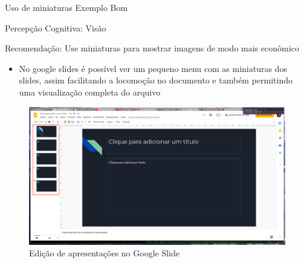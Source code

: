 \documentclass{beamer}
\begin{document}
\begin{frame}{Uso de miniaturas Exemplo Bom}

Percepção Cognitiva: Visão

Recomendação: Use miniaturas para mostrar imagens de modo mais econômico

\begin{itemize}
    \item No google slides é possível ver um pequeno menu com as miniaturas dos slides, assim facilitando a locomoção no documento e também permitindo uma visualização completa do arquivo
\end{itemize}
\begin{figure}
    \centering
    \includegraphics[scale=0.1]{images/google-slide.png}
    \caption{Edição de apresentações no Google Slide}
\end{figure}

\end{frame}
\end{document}
